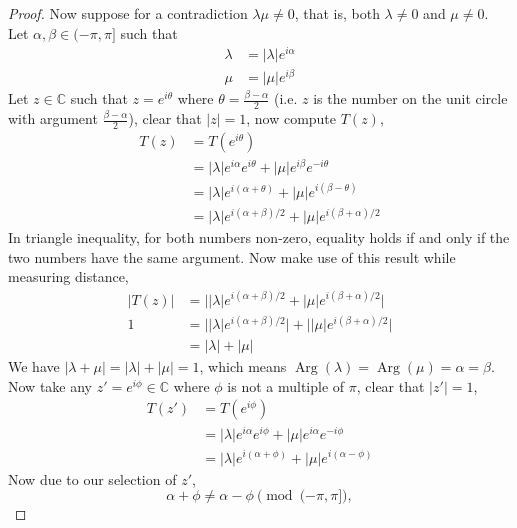 \documentclass{article}
\theoremstyle{definition}
\numberwithin{lemma}{problem}
\numberwithin{equation}{problem}
\newcommand{\C}{\mathbb{C}}
\newcommand{\abs}[1]{\left\lvert #1\right\rvert}
\DeclareMathOperator\Arg{Arg}
\begin{document}
\begin{proof}
    Now suppose for a contradiction $\lambda\mu \ne 0$, that is, both $\lambda \ne 0$ and $\mu \ne 0$.
    Let $\alpha, \beta \in (-\pi, \pi]$ such that
    \begin{align*}
        \lambda &= \abs\lambda e^{i\alpha}\\
        \mu &= \abs\mu e^{i\beta}
    \end{align*}
    Let $z\in \C$ such that $z = e^{i\theta}$ where $\theta = \frac{\beta - \alpha}{2}$
    (i.e. $z$ is the number on the unit circle with argument $\frac{\beta - \alpha}{2}$),
    clear that $\abs{z} = 1$, now compute $T(z)$,
    \begin{align*}
        T(z) &= T(e^{i\theta})  \\
        &= \abs\lambda e^{i\alpha} e^{i\theta} + \abs\mu e^{i\beta} e^{-i\theta}    \\
        &= \abs\lambda e^{i(\alpha + \theta)} + \abs\mu e^{i(\beta -\theta)}    \\
        &= \abs\lambda e^{i(\alpha + \beta)/2} + \abs\mu e^{i(\beta +\alpha)/2}
    \end{align*}
    In triangle inequality, for both numbers non-zero,
    equality holds if and only if the two numbers have the same argument.
    Now make use of this result while measuring distance,
    \begin{align*}
        \abs{T(z)} &= \bigl\lvert \abs\lambda e^{i(\alpha + \beta)/2} + \abs\mu e^{i(\beta +\alpha)/2} \bigr\rvert  \\
        1 &= \bigl\lvert \abs\lambda e^{i(\alpha + \beta)/2} \bigr\rvert
            +\bigl\lvert \abs\mu e^{i(\beta +\alpha)/2} \bigr\rvert  \\
        &= \abs\lambda + \abs\mu
    \end{align*}
    We have $\abs{\lambda + \mu} = \abs\lambda + \abs\mu = 1$,
    which means $\Arg(\lambda) = \Arg(\mu) = \alpha = \beta$.
    Now take any $z' = e^{i\phi} \in \C$ where $\phi$ is not a multiple of $\pi$,
    clear that $\abs{z'} = 1$,
    \begin{align*}
        T(z') &= T(e^{i\phi})   \\
        &= \abs\lambda e^{i\alpha}e^{i\phi} + \abs\mu e^{i\alpha}e^{-i\phi} \\
        &= \abs\lambda e^{i(\alpha+\phi)} + \abs\mu e^{i(\alpha-\phi)}
    \end{align*}
    Now due to our selection of $z'$,
    $$\alpha + \phi \ne \alpha - \phi \pmod{(-\pi,\pi]},$$

\end{proof}
\end{document}
